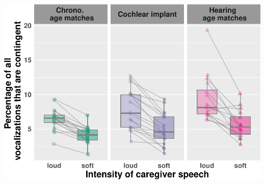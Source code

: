 \documentclass[
]{article}
\begin{document}
\includegraphics{everyday_CI_files/figure-latex/visualize split by intensity-1.pdf}
\end{document}
